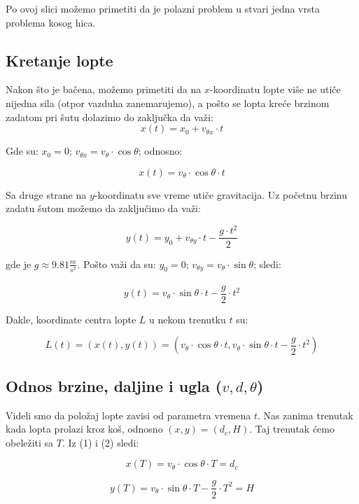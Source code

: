\documentclass[a4paper, 12pt]{article}
\begin{document}
Po ovoj slici možemo primetiti da je polazni problem u stvari jedna vrsta problema kosog hica.



\subsection{Kretanje lopte}

Nakon što je bačena, možemo primetiti da na $x$-koordinatu lopte više ne utiče nijedna sila (otpor vazduha zanemarujemo), a pošto se lopta kreće brzinom zadatom pri šutu dolazimo do zaključka da važi:\\


\[x(t) = x_0 + v_{\theta x}\cdot t\]


Gde su: $x_0 = 0$; $v_{\theta x} = v_\theta \cdot \cos \theta$; odnosno:

\begin{equation}
x(t) = v_\theta \cdot \cos \theta \cdot t
\end{equation}

Sa druge strane na $y$-koordinatu sve vreme utiče gravitacija. Uz početnu brzinu zadatu šutom možemo da zaključimo da važi:

\[y(t) = y_0 + v_{\theta y} \cdot t - \dfrac{g \cdot t^2}{2}\]

gde je $g \approx 9.81\dfrac{_m}{^{s^2}}$. Pošto važi da su: $y_0 = 0$; $v_{\theta y} = v_\theta \cdot \sin \theta$; sledi:

\begin{equation}
y(t) = v_\theta \cdot \sin \theta\cdot t - \dfrac{g}{2} \cdot t^2
\end{equation}

Dakle, koordinate centra lopte $L$ u nekom trenutku $t$ su:

\[L(t) = (x(t), y(t)) = (v_\theta \cdot \cos \theta \cdot t, v_\theta \cdot \sin \theta \cdot t - \dfrac{g}{2} \cdot t^2)\]

\subsection{Odnos brzine, daljine i ugla ($v, d, \theta$)}

Videli smo da položaj lopte zavisi od parametra vremena $t$. Nas zanima trenutak kada lopta prolazi kroz koš, odnosno $(x,y) = (d_c,H)$. Taj trenutak ćemo obeležiti sa $T$. Iz (1) i (2) sledi:

\[x(T) = v_\theta \cdot \cos \theta \cdot T = d_c\]

\[y(T) = v_{\theta} \cdot \sin \theta \cdot T - \dfrac{g}{2} \cdot T^2 = H\]
\end{document}
